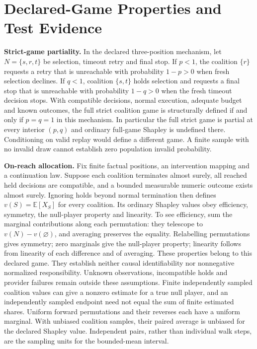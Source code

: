 \documentclass[conference]{IEEEtran}
\begin{document}
\section{Declared-Game Properties and Test Evidence}
\label{app:games}
\textbf{Strict-game partiality.} In the declared three-position mechanism,
let $N=\{s,r,t\}$ be selection, timeout retry and final stop. If $p<1$, the
coalition $\{r\}$ requests a retry that is unreachable with probability
$1-p>0$ when fresh selection declines. If $q<1$, coalition
$\{s,t\}$ holds selection and requests a final stop that is unreachable with
probability $1-q>0$ when the fresh timeout decision stops. With compatible
decisions, normal execution, adequate budget and known outcomes, the full strict
coalition game is structurally defined if and only if $p=q=1$ in this mechanism.
In particular the full strict game is partial at every interior $(p,q)$ and
ordinary full-game Shapley is undefined there. Conditioning on valid replay
would define a different game. A finite sample with no invalid draw cannot
establish zero population invalid probability.

\textbf{On-reach allocation.} Fix finite factual positions, an intervention
mapping and a continuation law. Suppose each coalition terminates almost surely,
all reached held decisions are compatible, and a bounded measurable numeric
outcome exists almost surely. Ignoring holds beyond normal termination then
defines $v(S)=\mathbb{E}[X_S]$ for every coalition. Its ordinary Shapley values
obey efficiency, symmetry, the null-player property and linearity. To see
efficiency, sum the marginal contributions along each permutation: they
telescope to $v(N)-v(\varnothing)$, and averaging preserves the equality.
Relabelling permutations gives symmetry; zero marginals give the null-player
property; linearity follows from linearity of each difference and of averaging.
These properties belong to this declared game. They establish neither causal
identifiability nor nonnegative normalized responsibility. Unknown observations,
incompatible holds and provider failures remain outside these assumptions.
Finite independently sampled coalition values can give a nonzero estimate for
a true null player, and an independently sampled endpoint need not equal the
sum of finite estimated shares.
Uniform forward permutations and their reverses each have a uniform marginal.
With unbiased coalition samples, their paired average is unbiased for the
declared Shapley value. Independent pairs, rather than individual walk steps,
are the sampling units for the bounded-mean interval.
\end{document}
